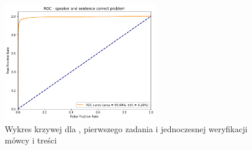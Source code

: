 \begin{figure}[H]
    \centering
    \includegraphics[width=0.6\textwidth]{images/4_3_gmm_roc_both}
    \caption{Wykres krzywej  dla , pierwszego zadania  i jednoczesnej weryfikacji mówcy i treści}
    \label{fig:4_3_gmm_roc_both}
\end{figure}

